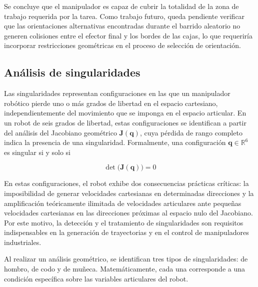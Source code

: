 \documentclass{article}
\begin{document}
Se concluye que el manipulador es capaz de cubrir la totalidad de la zona de trabajo requerida por la tarea. Como trabajo futuro, queda pendiente verificar que las orientaciones alternativas encontradas durante el barrido aleatorio no generen colisiones entre el efector final y los bordes de las cajas, lo que requeriría incorporar restricciones geométricas en el proceso de selección de orientación.

\subsection{Análisis de singularidades}
\label{sec:analisis_singularidades}

Las singularidades representan configuraciones en las que un manipulador robótico pierde uno o más grados de libertad en el espacio cartesiano, independientemente del movimiento que se imponga en el espacio articular. 
En un robot de seis grados de libertad, estas configuraciones se identifican a partir del análisis del Jacobiano geométrico $\mathbf{J}(\mathbf{q})$, cuya pérdida de rango completo indica la presencia de una singularidad. Formalmente, una configuración $\mathbf{q} \in \mathbb{R}^6$ es singular si y solo si

\begin{equation}
    \det\bigl(\mathbf{J}(\mathbf{q})\bigr) = 0
\end{equation}

En estas configuraciones, el robot exhibe dos consecuencias prácticas críticas: la imposibilidad de generar velocidades cartesianas en determinadas direcciones y la amplificación teóricamente ilimitada de velocidades articulares ante pequeñas velocidades cartesianas en las direcciones próximas al espacio nulo del Jacobiano. Por este motivo, la detección y el tratamiento de singularidades son requisitos indispensables en la generación de trayectorias y en el control de manipuladores industriales.


Al realizar un análisis geométrico, se identifican tres tipos de 
singularidades: de hombro, de codo y de muñeca. Matemáticamente, 
cada una corresponde a una condición específica sobre las variables 
articulares del robot.
\end{document}
